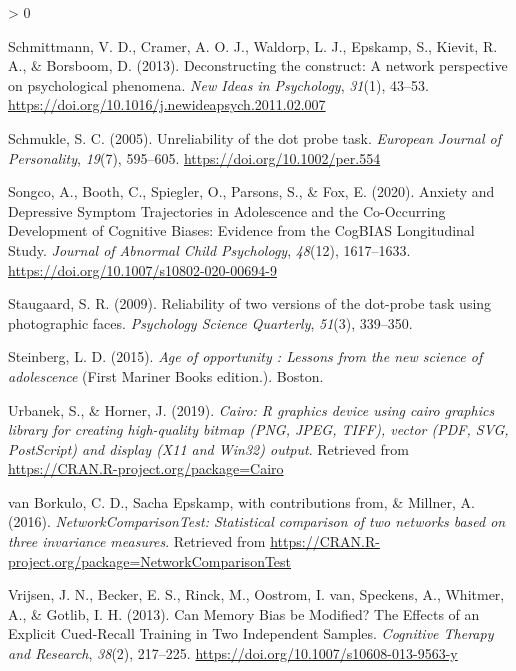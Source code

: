 \documentclass[
  english,
  man]{apa6}
\newlength{\cslhangindent}
\newenvironment{CSLReferences}[2] %
 {%
  \setlength{\parindent}{0pt}
  \ifodd #1 \everypar{\setlength{\hangindent}{\cslhangindent}}\ignorespaces\fi
  \ifnum #2 > 0
  \setlength{\parskip}{#2\baselineskip}
  \fi
 }%
 {}
\begin{document}
\begin{CSLReferences}{1}{0}
\leavevmode\hypertarget{ref-schmittmann_deconstructing_2013}{}%
Schmittmann, V. D., Cramer, A. O. J., Waldorp, L. J., Epskamp, S., Kievit, R. A., \& Borsboom, D. (2013). Deconstructing the construct: {A} network perspective on psychological phenomena. \emph{New Ideas in Psychology}, \emph{31}(1), 43--53. \url{https://doi.org/10.1016/j.newideapsych.2011.02.007}

\leavevmode\hypertarget{ref-Schmukle2005}{}%
Schmukle, S. C. (2005). Unreliability of the dot probe task. \emph{European Journal of Personality}, \emph{19}(7), 595--605. \url{https://doi.org/10.1002/per.554}

\leavevmode\hypertarget{ref-songco_anxiety_2020}{}%
Songco, A., Booth, C., Spiegler, O., Parsons, S., \& Fox, E. (2020). Anxiety and {Depressive} {Symptom} {Trajectories} in {Adolescence} and the {Co}-{Occurring} {Development} of {Cognitive} {Biases}: {Evidence} from the {CogBIAS} {Longitudinal} {Study}. \emph{Journal of Abnormal Child Psychology}, \emph{48}(12), 1617--1633. \url{https://doi.org/10.1007/s10802-020-00694-9}

\leavevmode\hypertarget{ref-Staugaard2009}{}%
Staugaard, S. R. (2009). Reliability of two versions of the dot-probe task using photographic faces. \emph{Psychology Science Quarterly}, \emph{51}(3), 339--350.

\leavevmode\hypertarget{ref-steinberg_age_2015}{}%
Steinberg, L. D. (2015). \emph{Age of opportunity : Lessons from the new science of adolescence} (First Mariner Books edition.). Boston.

\leavevmode\hypertarget{ref-R-Cairo}{}%
Urbanek, S., \& Horner, J. (2019). \emph{Cairo: R graphics device using cairo graphics library for creating high-quality bitmap (PNG, JPEG, TIFF), vector (PDF, SVG, PostScript) and display (X11 and Win32) output}. Retrieved from \url{https://CRAN.R-project.org/package=Cairo}

\leavevmode\hypertarget{ref-R-NetworkComparisonTest}{}%
van Borkulo, C. D., Sacha Epskamp, with contributions from, \& Millner, A. (2016). \emph{NetworkComparisonTest: Statistical comparison of two networks based on three invariance measures}. Retrieved from \url{https://CRAN.R-project.org/package=NetworkComparisonTest}

\leavevmode\hypertarget{ref-Vrijsen2013}{}%
Vrijsen, J. N., Becker, E. S., Rinck, M., Oostrom, I. van, Speckens, A., Whitmer, A., \& Gotlib, I. H. (2013). Can {Memory} {Bias} be {Modified}? {The} {Effects} of an {Explicit} {Cued}-{Recall} {Training} in {Two} {Independent} {Samples}. \emph{Cognitive Therapy and Research}, \emph{38}(2), 217--225. \url{https://doi.org/10.1007/s10608-013-9563-y}


\end{CSLReferences}
\end{document}
